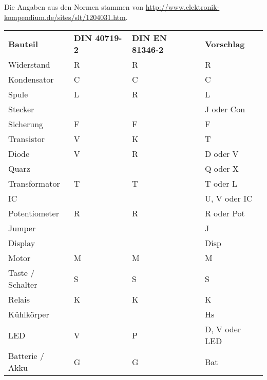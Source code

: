 Die Angaben aus den Normen stammen von 
\url{http://www.elektronik-kompendium.de/sites/slt/1204031.htm}. 
\begin{table}[h!]
  \begin{tabular}{llll}
  \rowcolor{white}  \textbf{Bauteil} 	    
                                            & \textbf{DIN 40719-2} 
                                                    & \textbf{DIN EN 81346-2}          
                                                            & \textbf{Vorschlag}\\
  \rowcolor{lgray}  Widerstand              & R     & R     & R \\
  \rowcolor{white}  Kondensator             & C     & C     & C \\
  \rowcolor{lgray}  Spule                   & L     & R     & L \\
  \rowcolor{white}  Stecker                 &       &       & J oder Con \\
  \rowcolor{lgray}  Sicherung               & F     & F     & F \\
  \rowcolor{white}  Transistor              & V     & K     & T \\
  \rowcolor{lgray}  Diode                   & V     & R     & D oder V \\
  \rowcolor{white}  Quarz                   &       &       & Q oder X \\
  \rowcolor{lgray}  Transformator           & T     & T     & T oder L \\
  \rowcolor{white}  IC                      &       &       & U, V oder IC \\
  \rowcolor{lgray}  Potentiometer           & R     & R     & R oder Pot \\
  \rowcolor{white}  Jumper                  &       &       & J \\
  \rowcolor{lgray}  Display                 &       &       & Disp \\
  \rowcolor{white}  Motor                   & M     & M     & M \\
  \rowcolor{lgray}  Taste / Schalter        & S     & S     & S \\
  \rowcolor{white}  Relais                  & K     & K     & K \\
  \rowcolor{lgray}  Kühlkörper              &       &       & Hs \\
  \rowcolor{white}  LED                     & V     & P     & D, V oder LED \\
  \rowcolor{lgray}  Batterie / Akku         & G     & G     & Bat \\

\end{tabular}
\end{table}
